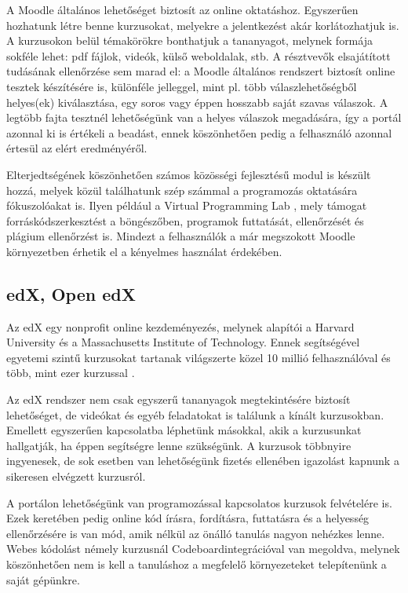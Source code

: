 A Moodle általános lehetőséget biztosít az online oktatáshoz. Egyszerűen hozhatunk létre benne kurzusokat, melyekre a jelentkezést akár korlátozhatjuk is. A kurzusokon belül témakörökre bonthatjuk a tananyagot, melynek formája sokféle lehet: pdf fájlok, videók, külső weboldalak, stb. A résztvevők elsajátított tudásának ellenőrzése sem marad el: a Moodle általános rendszert biztosít online tesztek készítésére is, különféle jelleggel, mint pl. több válaszlehetőségből helyes(ek) kiválasztása, egy soros vagy éppen hosszabb saját szavas válaszok. A legtöbb fajta tesztnél lehetőségünk van a helyes válaszok megadására, így a portál azonnal ki is értékeli a beadást, ennek köszönhetően pedig a felhasználó azonnal értesül az elért eredményéről.

Elterjedtségének köszönhetően számos közösségi fejlesztésű modul is készült hozzá, melyek közül találhatunk szép számmal a programozás oktatására fókuszolóakat is. Ilyen például a Virtual Programming Lab \cite{VPL} \cite{VPLJournal}, mely támogat forráskódszerkesztést a böngészőben, programok futtatását, ellenőrzését és plágium ellenőrzést is. Mindezt a felhasználók a már megszokott Moodle környezetben érhetik el a kényelmes használat érdekében.

\subsection*{edX, Open edX}
Az edX \cite{EDXAbout} egy nonprofit online kezdeményezés, melynek alapítói a Harvard University és a Massachusetts Institute of Technology. Ennek segítségével egyetemi szintű kurzusokat tartanak világszerte közel 10 millió felhasználóval és több, mint ezer kurzussal \cite{EDXReview}.

Az edX rendszer nem csak egyszerű tananyagok megtekintésére biztosít lehetőséget, de videókat és egyéb feladatokat is találunk a kínált kurzusokban. Emellett egyszerűen kapcsolatba léphetünk másokkal, akik a kurzusunkat hallgatják, ha éppen segítségre lenne szükségünk. A kurzusok többnyire ingyenesek, de sok esetben van lehetőségünk fizetés ellenében igazolást kapnunk a sikeresen elvégzett kurzusról.

A portálon lehetőségünk van programozással kapcsolatos kurzusok felvételére is. Ezek keretében pedig online kód írásra, fordításra, futtatásra és a helyesség ellenőrzésére is van mód, amik nélkül az önálló tanulás nagyon nehézkes lenne. Webes kódolást némely kurzusnál Codeboard\footnotemark integrációval van megoldva, melynek köszönhetően nem is kell a tanuláshoz a megfelelő környezeteket telepítenünk a saját gépünkre.


